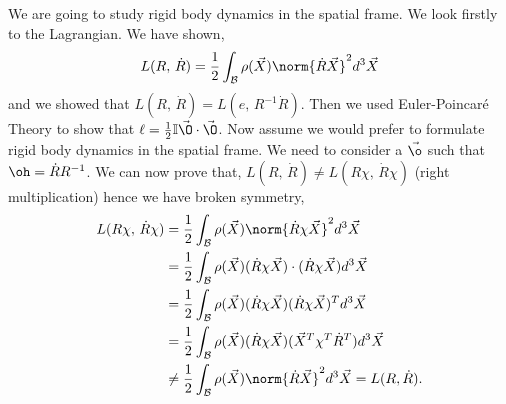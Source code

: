\noindent
We are going to study rigid body dynamics in the spatial frame. We look firstly to the Lagrangian. We have shown,
$$ L(R,\,\dot R) = \frac{1}{2} \int_\mathcal{B} \rho(\vec X) \norm{\dot R \vec X}^2 d^3\vec X $$
and we showed that $L(R,\, \dot R) = L(e,\, R^{-1}\dot R)$. Then we used Euler-Poincar\'e Theory to show that $\ell = \frac{1}{2}\mathbb{I}\vec\O \cdot \vec\O$. Now assume we would prefer to formulate rigid body dynamics in the spatial frame. We need to consider a $\vec\o$ such that $\oh = \dot R R^{-1}$. We can now prove that, $L(R,\,\dot R) \ne L(R\chi,\,\dot R\chi)$ (right multiplication) hence we have broken symmetry,
\begin{align*}
  L(R\chi,\,\dot R\chi) &= \frac{1}{2} \int_\mathcal{B} \rho(\vec X) \norm{\dot R \chi\vec X}^2 d^3\vec X \\
  &= \frac{1}{2} \int_\mathcal{B} \rho(\vec X) (\dot R \chi\vec X) \cdot (\dot R \chi\vec X) d^3\vec X \\
  &= \frac{1}{2} \int_\mathcal{B} \rho(\vec X) (\dot R \chi\vec X)  (\dot R \chi\vec X)^T d^3\vec X \\
  &= \frac{1}{2} \int_\mathcal{B} \rho(\vec X) (\dot R \chi\vec X)  (\vec X^T\chi^T\dot R^T) d^3\vec X \\
  &\ne \frac{1}{2} \int_\mathcal{B} \rho(\vec X) \norm{\dot R \vec X}^2 d^3\vec X = L(R, \dot R).
\end{align*}

